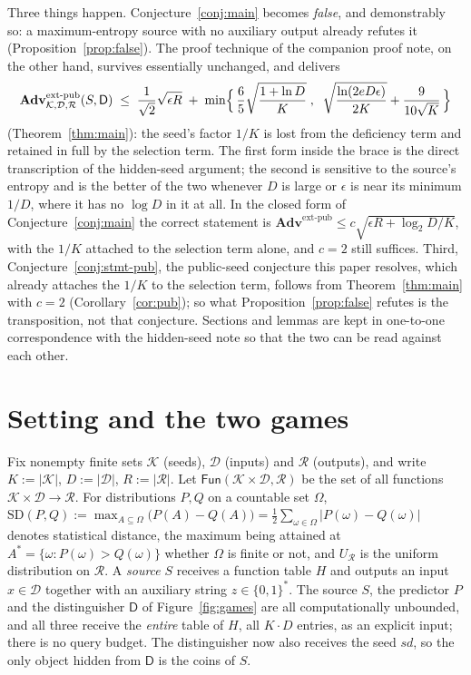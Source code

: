 \documentclass{aicr-solution}
\newcommand{\Fun}{\mathsf{Fun}}
\newcommand{\Adv}{\mathbf{Adv}}
\newcommand{\extp}{\mathrm{ext}\text{-}\mathrm{pub}}
\newcommand{\sd}{\mathit{sd}}
\newcommand{\SD}{\mathrm{SD}}
\newcommand{\calK}{\mathcal{K}}
\newcommand{\calD}{\mathcal{D}}
\newcommand{\calR}{\mathcal{R}}
\begin{document}
\noindent
Three things happen. Conjecture~\ref{conj:main} becomes \emph{false}, and demonstrably so: a
maximum-entropy source with no auxiliary output already refutes it
(Proposition~\ref{prop:false}). The proof technique of the companion proof note, on the other
hand, survives essentially unchanged, and delivers
\[
  \Adv^{\extp}_{\calK,\calD,\calR}(S,\mathsf{D})
  \;\le\; \frac{1}{\sqrt{2}}\sqrt{\epsilon R}
  \;+\; \min\Bigl\{\, \frac{6}{5}\sqrt{\frac{1 + \ln D}{K}} \;,\;\;
        \sqrt{\frac{\ln(2eD\epsilon)}{2K}} + \frac{9}{10\sqrt{K}} \,\Bigr\}
\]
(Theorem~\ref{thm:main}): the seed's factor $1/K$ is lost from the deficiency term and retained in
full by the selection term. The first form inside the brace is the direct transcription of the
hidden-seed argument; the second is sensitive to the source's entropy and is the better of the two
whenever $D$ is large or $\epsilon$ is near its minimum $1/D$, where it has no $\log D$ in it at
all. In the closed form of Conjecture~\ref{conj:main} the correct statement is
$\Adv^{\extp} \le c\sqrt{\epsilon R + \log_2 D / K}$, with the $1/K$ attached to the selection term
alone, and $c = 2$ still suffices. Third, Conjecture~\ref{conj:stmt-pub}, the public-seed
conjecture this paper resolves, which already attaches the $1/K$ to the selection term, follows from
Theorem~\ref{thm:main} with $c = 2$ (Corollary~\ref{cor:pub}); so what
Proposition~\ref{prop:false} refutes is the transposition, not that conjecture. Sections and lemmas are kept in one-to-one correspondence with
the hidden-seed note so that the two can be read against each other.

\section{Setting and the two games}\label{sec:setting}

Fix nonempty finite sets $\calK$ (seeds), $\calD$ (inputs) and $\calR$ (outputs), and write
$K := |\calK|$, $D := |\calD|$, $R := |\calR|$. Let $\Fun(\calK \times \calD, \calR)$ be the set of
all functions $\calK \times \calD \to \calR$. For distributions $P, Q$ on a countable set $\Omega$,
\(
  \SD(P,Q) := \max_{A \subseteq \Omega}\bigl(P(A) - Q(A)\bigr)
            = \tfrac12 \sum_{\omega \in \Omega} |P(\omega) - Q(\omega)|
\)
denotes statistical distance, the maximum being attained at
$A^{*} = \{\omega : P(\omega) > Q(\omega)\}$ whether $\Omega$ is finite or not, and $U_{\calR}$ is the uniform distribution on $\calR$. A
\emph{source} $S$ receives a function table $H$ and outputs an input $x \in \calD$ together with an
auxiliary string $z \in \{0,1\}^{*}$. The source $S$, the predictor $P$ and the distinguisher $\mathsf{D}$ of
Figure~\ref{fig:games} are all computationally unbounded, and all three receive the \emph{entire}
table of $H$, all $K \cdot D$ entries, as an explicit input; there is no query budget. The
distinguisher now also receives the seed $\sd$, so the only object hidden from $\mathsf{D}$ is the
coins of $S$.
\end{document}

